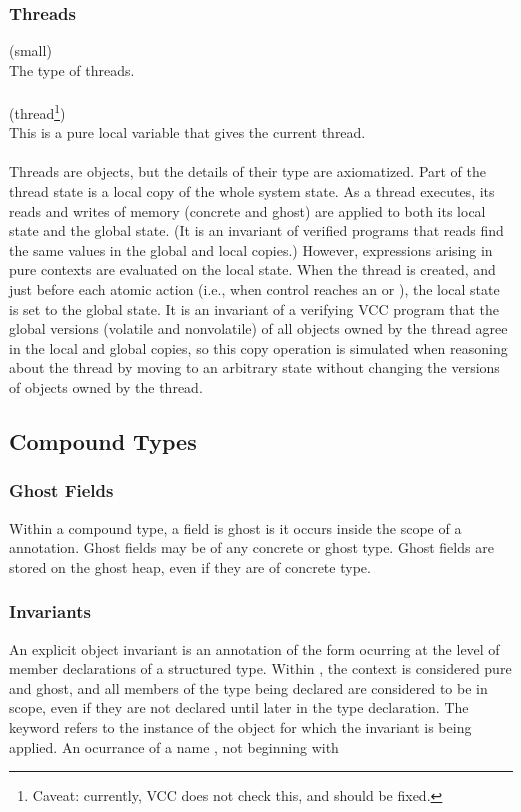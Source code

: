 \documentclass[preprint,nocopyrightspace]{sigplanconf}
\begin{document}
{{\subsubsection{Threads}
\vcc{\thread} (small) \\
The type of threads. 
\\\\
 (thread\footnote{Caveat: currently, VCC does
not check this, and should be fixed.})\\
This is a pure local variable that gives the current
thread. 
\\\\
Threads are objects, but the details of their type
are axiomatized. Part of the thread state is a local copy of 
the whole system state. As a thread executes, its reads and writes of
memory (concrete and ghost) are applied to both its local state and
the global state. (It is an invariant of verified programs that reads
find the same values in the global and local copies.)  However,
expressions arising in pure contexts are evaluated on the local state.
When the thread is created, and just before each atomic action (i.e.,
when control reaches an  or ), the
local state is set to the global 
state. It is an invariant of a verifying VCC program that the global
versions (volatile and nonvolatile) of all objects owned by the thread
agree in the local and global copies, so this copy operation is
simulated when reasoning about the thread by moving to an arbitrary
state without changing the versions of objects owned by the thread. 

\subsection{Compound Types}
 
\subsubsection{Ghost Fields}
Within a compound type, a field is ghost is it occurs inside the scope
of a   annotation. Ghost fields may be of any concrete
or ghost type. Ghost fields are stored on the ghost heap, even if they
are of concrete type.

\subsubsection{Invariants}
An explicit object invariant is an annotation of the form 
ocurring at the level of member declarations of a structured
type. Within , the context is considered pure and ghost, 
and all members of the type being declared are
considered to be in scope, even if they are not declared until later
in the type declaration. The keyword \vcc{\this} refers to the
instance of the object for which the invariant is being applied. An
ocurrance of a name , not beginning with }}
\end{document}
